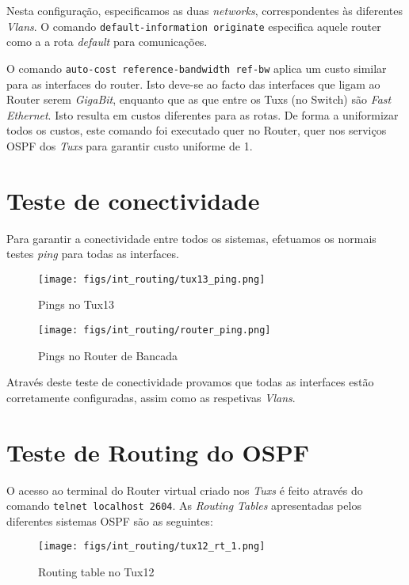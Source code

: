 Nesta configuração, especificamos as duas \textit{networks}, correspondentes às diferentes \textit{Vlans}.
O comando \verb|default-information originate| especifica aquele router como a a rota \textit{default} para comunicações.

O comando \verb|auto-cost reference-bandwidth ref-bw| aplica um custo similar para as interfaces do router.
Isto deve-se ao facto das interfaces que ligam ao Router serem \textit{GigaBit}, enquanto que as que entre os Tuxs (no Switch) são \textit{Fast Ethernet}.
Isto resulta em custos diferentes para as rotas. De forma a uniformizar todos os custos, este comando foi executado quer no Router, quer nos serviços OSPF dos \textit{Tuxs} para garantir custo uniforme de 1.

\pagebreak

\section{Teste de conectividade}

Para garantir a conectividade entre todos os sistemas, efetuamos os normais testes \textit{ping} para todas as interfaces.

\begin{figure}[H]
    \centering
    \texttt{[image: figs/int\_routing/tux13\_ping.png]}
    \caption{Pings no Tux13}
    \label{fig:tux13_ping}
\end{figure}

\begin{figure}[H]
    \centering
    \texttt{[image: figs/int\_routing/router\_ping.png]}
    \caption{Pings no Router de Bancada}
    \label{fig:router_ping}
\end{figure}

Através deste teste de conectividade provamos que todas as interfaces estão corretamente configuradas, assim como as respetivas \textit{Vlans}.

\pagebreak

\section{Teste de Routing do OSPF}

O acesso ao terminal do Router virtual criado nos \textit{Tuxs} é feito através do comando \verb|telnet localhost 2604|.
As \textit{Routing Tables} apresentadas pelos diferentes sistemas OSPF são as seguintes:

\begin{figure}[H]
    \centering
    \texttt{[image: figs/int\_routing/tux12\_rt\_1.png]}
    \caption{Routing table no Tux12}
    \label{fig:tux12_rt_1}
\end{figure}

